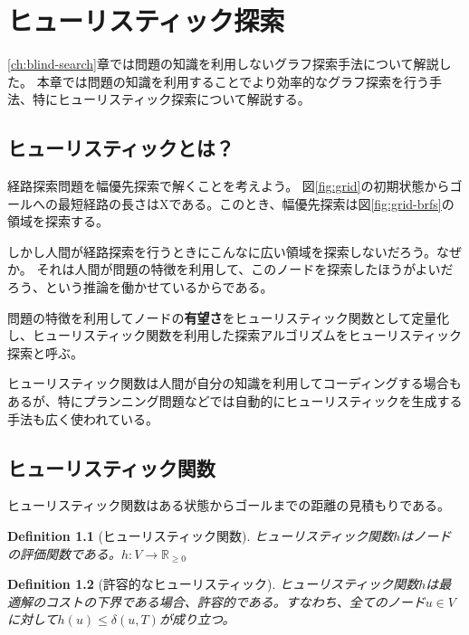 \documentclass{report}
\newtheorem{definition}{Definition}
\begin{document}



\chapter{ヒューリスティック探索}
\label{ch:heuristic-search}

\ref{ch:blind-search}章では問題の知識を利用しないグラフ探索手法について解説した。
本章では問題の知識を利用することでより効率的なグラフ探索を行う手法、特にヒューリスティック探索について解説する。

\section{ヒューリスティックとは？}
\label{sec:heursitic}

経路探索問題を幅優先探索で解くことを考えよう。
図\ref{fig:grid}の初期状態からゴールへの最短経路の長さはXである。このとき、幅優先探索は図\ref{fig:grid-brfs}の領域を探索する。

しかし人間が経路探索を行うときにこんなに広い領域を探索しないだろう。なぜか。
それは人間が問題の特徴を利用して、このノードを探索したほうがよいだろう、という推論を働かせているからである。

問題の特徴を利用してノードの{\bf 有望さ}をヒューリスティック関数として定量化し、ヒューリスティック関数を利用した探索アルゴリズムをヒューリスティック探索と呼ぶ。

ヒューリスティック関数は人間が自分の知識を利用してコーディングする場合もあるが、特にプランニング問題などでは自動的にヒューリスティックを生成する手法も広く使われている。


\section{ヒューリスティック関数}
\label{sec:heuristic-function}

ヒューリスティック関数はある状態からゴールまでの距離の見積もりである。

\begin{definition}[ヒューリスティック関数]
ヒューリスティック関数$h$はノードの評価関数である。$h: V \rightarrow \mathbb{R}_{\geq 0}$
\end{definition}

\begin{definition}[許容的なヒューリスティック]
ヒューリスティック関数$h$は最適解のコストの下界である場合、許容的である。すなわち、全てのノード$u \in V$に対して$h(u) \leq \delta(u, T)$が成り立つ。
\end{definition}
\end{document}

